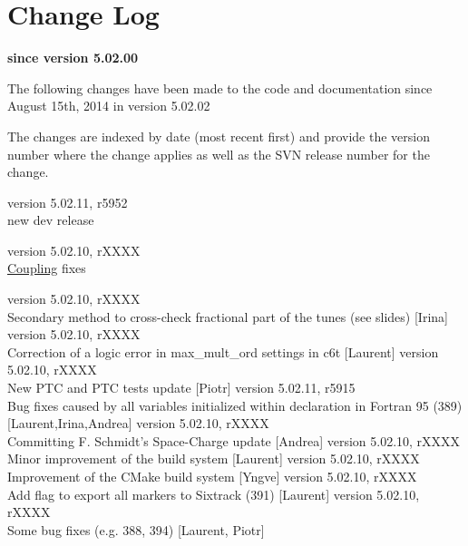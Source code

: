 \chapter*{Change Log}
\label{chap:changelog}

\begin{center} 
\textbf{since version 5.02.00}
\end{center}

The following changes have been made to the code and documentation since
August 15th, 2014 in version 5.02.02

The changes are indexed by date (most recent first) and provide the \madx 
version number where the change applies as well as the SVN 
release number for the change. 

\begin{madlist}
   version 5.02.11, r5952\\
  new dev release
  
   version 5.02.10, rXXXX\\
    \hyperref[sec:coupling]{Coupling} fixes  
  
   version 5.02.10, rXXXX\\ 
    Secondary method to cross-check fractional part of the tunes (see slides) [Irina]
   version 5.02.10, rXXXX\\
    Correction of a logic error in max\_mult\_ord settings in c6t [Laurent]
   version 5.02.10, rXXXX\\
    New PTC and PTC tests update [Piotr]
  version 5.02.11, r5915\\
    Bug fixes caused by all variables initialized within declaration in Fortran 95 (389) [Laurent,Irina,Andrea]
   version 5.02.10, rXXXX\\
    Committing F. Schmidt's Space-Charge update [Andrea]
   version 5.02.10, rXXXX\\
    Minor improvement of the build system [Laurent]
   version 5.02.10, rXXXX\\
    Improvement of the CMake build system [Yngve]
   version 5.02.10, rXXXX\\
    Add flag to export all markers to Sixtrack (391) [Laurent]
   version 5.02.10, rXXXX\\
    Some bug fixes (e.g. 388, 394) [Laurent, Piotr]


\end{madlist}
